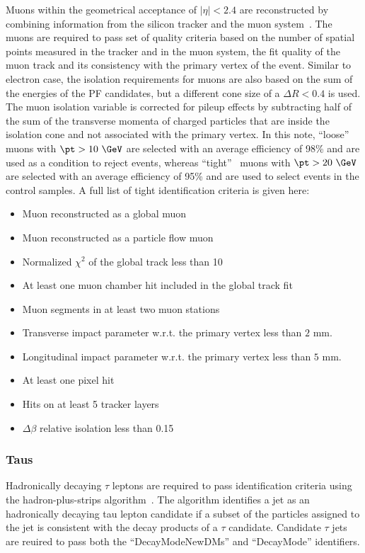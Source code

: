 Muons within the geometrical acceptance of $|\eta| < 2.4$ are reconstructed by combining information from the silicon tracker and the muon system~\cite{Chatrchyan:2012xi}. The muons are required to pass set of quality criteria based on the number of spatial points measured in the tracker and in the muon system, the fit quality of the muon track and its consistency with the primary vertex of the event. Similar to electron case, the isolation requirements for muons are also based on the sum of the energies of the PF candidates, but a different cone size of a $\Delta R < 0.4$ is used. The muon isolation variable is corrected for pileup effects by subtracting half of the sum of the transverse momenta of charged particles that are inside the isolation cone and not associated with the primary vertex. In this note, ``loose''~\cite{CMS-MUO-TWIKI-IDLOOSE} muons with $\pt>10~\GeV$ are selected with an average efficiency of 98\% and are used as a condition to reject events,
whereas ``tight''~\cite{CMS-MUO-TWIKI-IDTIGHT} muons with $\pt>20~\GeV$ are selected with an average efficiency of 95\% and are
used to select events in the control samples. A full list of tight identification criteria is given here:

\begin{itemize}
\item Muon reconstructed as a global muon
\item Muon reconstructed as a particle flow muon
\item Normalized $\chi^2$ of the global track less than 10
\item At least one muon chamber hit included in the global track fit
\item Muon segments in at least two muon stations
\item Transverse impact parameter w.r.t. the primary vertex less than $2$ mm.
\item Longitudinal impact parameter w.r.t. the primary vertex less than $5$ mm.
\item At least one pixel hit
\item Hits on at least 5 tracker layers
\item $\Delta\beta$ relative isolation less than 0.15
\end{itemize}

\subsubsection{Taus}

Hadronically decaying $\tau$ leptons are required to pass identification criteria
using the hadron-plus-strips algorithm~\cite{Khachatryan:2015dfa}. The algorithm
identifies a jet as an hadronically decaying tau lepton candidate if a subset of the
particles assigned to the jet is consistent with the decay products of a $\tau$ candidate.
Candidate $\tau$ jets are reuired to pass both the ``DecayModeNewDMs'' and ``DecayMode'' identifiers.

